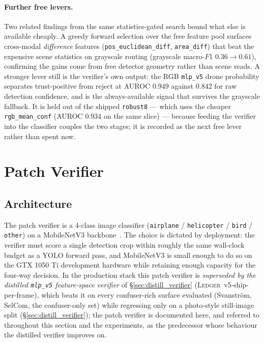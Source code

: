 \documentclass[12pt,a4paper,oneside,openright]{book}
\begin{document}
\paragraph{Further free levers.}
Two related findings from the same statistics-gated search bound what else is available cheaply. A greedy forward selection over the free feature pool surfaces cross-modal \emph{difference} features (\texttt{pos\_euclidean\_diff}, \texttt{area\_diff}) that beat the expensive scene statistics on grayscale routing (grayscale macro-$F1$ $0.36 \to 0.61$), confirming the gains come from free detector geometry rather than scene reads. A stronger lever still is the verifier's own output: the RGB \texttt{mlp\_v5} drone probability separates trust-positive from reject at AUROC $0.949$ against $0.842$ for raw detection confidence, and is the always-available signal that survives the grayscale fallback. It is held out of the shipped \texttt{robust8} --- which uses the cheaper \texttt{rgb\_mean\_conf} (AUROC $0.934$ on the same slice) --- because feeding the verifier into the classifier couples the two stages; it is recorded as the next free lever rather than spent now.

\section{Patch Verifier}
\label{sec:patch_verifier_arch}

\subsection{Architecture}

The patch verifier is a 4-class image classifier (\texttt{airplane} / \texttt{helicopter} / \texttt{bird} / \texttt{other}) on a MobileNetV3 backbone~\cite{howard2019mobilenetv3}. The choice is dictated by deployment: the verifier must score a single detection crop within roughly the same wall-clock budget as a YOLO forward pass, and MobileNetV3 is small enough to do so on the GTX 1050 Ti development hardware while retaining enough capacity for the four-way decision. In the production stack this patch verifier is \emph{superseded by the distilled \texttt{mlp\_v5} feature-space verifier} of \S\ref{sec:distill_verifier} (\textsc{Ledger}~v5-ship-per-frame), which beats it on every confuser-rich surface evaluated (Svanstr\"om, SelCom, the confuser-only set) while regressing only on a photo-style still-image split (\S\ref{sec:distill_verifier}); the patch verifier is documented here, and referred to throughout this section and the experiments, as the predecessor whose behaviour the distilled verifier improves on.
\end{document}
